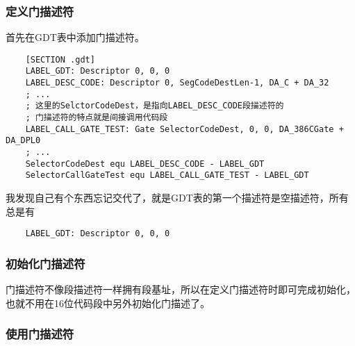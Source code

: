\documentclass[a4paper,left=2.5cm,right=2.5cm,11pt]{article}
\begin{document}
\subsubsection{定义门描述符}
	首先在GDT表中添加门描述符。
	\begin{lstlisting}
	[SECTION .gdt]
	LABEL_GDT: Descriptor 0, 0, 0
	LABEL_DESC_CODE: Descriptor 0, SegCodeDestLen-1, DA_C + DA_32
	; ...
	; 这里的SelctorCodeDest，是指向LABEL_DESC_CODE段描述符的
	; 门描述符的特点就是间接调用代码段
	LABEL_CALL_GATE_TEST: Gate SelectorCodeDest, 0, 0, DA_386CGate + DA_DPL0
	; ...
	SelectorCodeDest equ LABEL_DESC_CODE - LABEL_GDT
	SelectorCallGateTest equ LABEL_CALL_GATE_TEST - LABEL_GDT
	\end{lstlisting}

	我发现自己有个东西忘记交代了，就是GDT表的第一个描述符是空描述符，所有总是有
	\begin{lstlisting}
	LABEL_GDT: Descriptor 0, 0, 0
	\end{lstlisting}

\subsubsection{初始化门描述符}
	门描述符不像段描述符一样拥有段基址，所以在定义门描述符时即可完成初始化，也就不用在16位代码段中另外初始化门描述了。

\subsubsection{使用门描述符}
	
\end{document}
